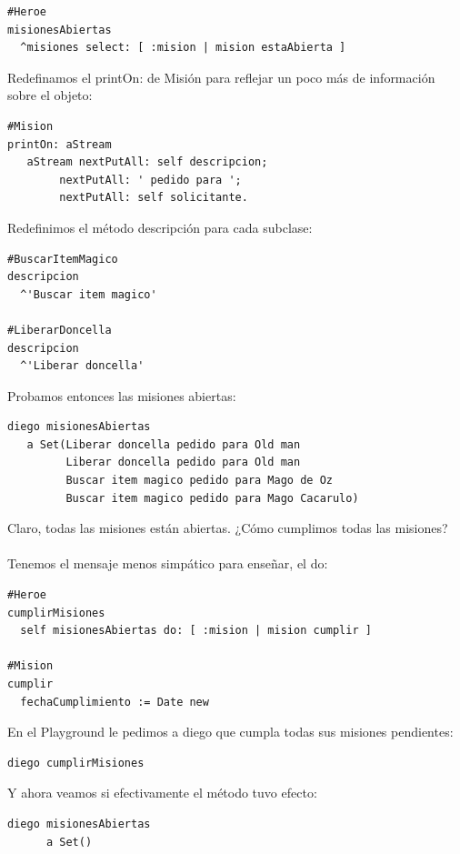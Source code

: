\documentclass[a4paper,12pt]{book}
\begin{document}
\begin{lstlisting}[frame=single]
#Heroe
misionesAbiertas
  ^misiones select: [ :mision | mision estaAbierta ] 
\end{lstlisting}

Redefinamos el printOn: de Misión para reflejar un poco más de información sobre el objeto:

\begin{lstlisting}[frame=single]
#Mision
printOn: aStream
   aStream nextPutAll: self descripcion;
		nextPutAll: ' pedido para ';
		nextPutAll: self solicitante.
\end{lstlisting}

Redefinimos el método descripción para cada subclase:

\begin{lstlisting}[frame=single]
#BuscarItemMagico
descripcion
  ^'Buscar item magico'

#LiberarDoncella
descripcion
  ^'Liberar doncella'
\end{lstlisting}
  
Probamos entonces las misiones abiertas:
\begin{lstlisting}[frame=single]
diego misionesAbiertas
   a Set(Liberar doncella pedido para Old man 
         Liberar doncella pedido para Old man 
         Buscar item magico pedido para Mago de Oz 
         Buscar item magico pedido para Mago Cacarulo)
\end{lstlisting}

Claro, todas las misiones están abiertas. ¿Cómo cumplimos todas las misiones?
\\
\\
Tenemos el mensaje menos simpático para enseñar, el do:

\begin{lstlisting}[frame=single]
#Heroe
cumplirMisiones
  self misionesAbiertas do: [ :mision | mision cumplir ] 
  
#Mision
cumplir
  fechaCumplimiento := Date new
\end{lstlisting}

En el Playground le pedimos a diego que cumpla todas sus misiones pendientes:

\begin{lstlisting}[frame=single]
diego cumplirMisiones
\end{lstlisting}

Y ahora veamos si efectivamente el método tuvo efecto:
\begin{lstlisting}[frame=single]
diego misionesAbiertas
      a Set()
\end{lstlisting}
\end{document}
